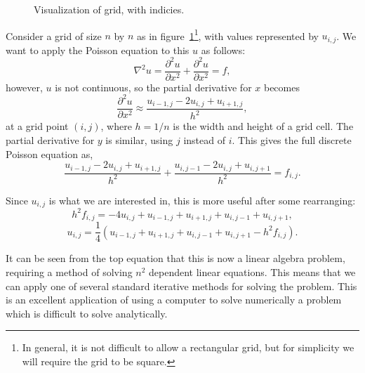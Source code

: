 \begin{figure}[htb]
	\centering
	
	\caption{Visualization of grid, with indicies.}
\label{grid}
\end{figure}

Consider a grid of size $n$ by $n$ as in figure~\ref{grid}\footnote{In general, it is not difficult to allow a rectangular grid, but for simplicity
we will require the grid to be square.}, with values represented by $u_{i,j}$. We want to apply the Poisson equation to
this $u$ as follows:
$$\nabla^2 u = \frac{\partial^2 u}{\partial x^2} + \frac{\partial^2 u}{\partial x^2} = f,$$
however, $u$ is not continuous, so the partial derivative for $x$ becomes
$$\frac{\partial^2 u}{\partial x^2} \approx \frac{u_{i-1,j} - 2 u_{i,j} + u_{i+1,j}}{h^2},$$
at a grid point $(i,j)$, where $h = 1 / n$ is the width and height of a grid cell. The partial derivative for $y$ is similar, using $j$ instead of $i$.
This gives the full discrete Poisson equation as\cite{poisson-relax}\cite{myths},
$$\frac{u_{i-1,j} - 2 u_{i,j} + u_{i+1,j}}{h^2} + \frac{u_{i,j-1} - 2 u_{i,j} + u_{i,j+1}}{h^2} = f_{i,j}.$$

Since $u_{i,j}$ is what we are interested in, this is more useful after some rearranging:
$$h^2f_{i,j} = -4u_{i,j} + u_{i-1,j} + u_{i+1,j} + u_{i,j-1} + u_{i,j+1},$$
\begin{equation} \label{eq:poisson}
u_{i,j} = \frac{1}{4}(u_{i-1,j} + u_{i+1,j} + u_{i,j-1} + u_{i,j+1} - h^2f_{i,j}).
\end{equation}

It can be seen from the top equation that this is now a linear algebra problem, requiring a method of solving
$n^2$ dependent linear equations. This means that we can apply one of several standard iterative methods
for solving the problem. This is an excellent application of using a computer to solve numerically a problem
	which is difficult to solve analytically.


